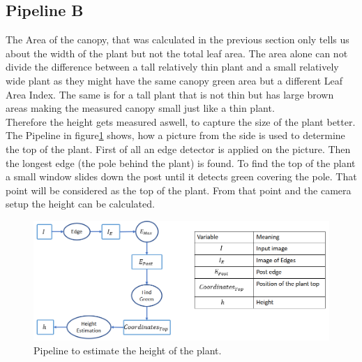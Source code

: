 \subsection{Pipeline B}

The Area of the canopy, that was calculated in the previous section only tells us about the width of the plant but not the total leaf area. The area alone can not divide the difference between a tall relatively thin plant and a small relatively wide plant as they might have the same canopy green area but a different Leaf Area Index. The same is for a tall plant that is not thin but has large brown areas making the measured canopy small just like a thin plant.\\
Therefore the height gets measured aswell, to capture the size of the plant better. The Pipeline in figure\ref{fig:pipelineB} shows, how a picture from the side is used to determine the top of the plant. First of all an edge detector is applied on the picture. Then the longest edge (the pole behind the plant) is found. To find the top of the plant a small window slides down the post until it detects green covering the pole. That point will be considered as the top of the plant. From that point and the camera setup the height can be calculated. 
   \begin{figure}[H]
       \centering
       \includegraphics[scale=0.6]{pipelineB.PNG}
       \caption{Pipeline to estimate the height of the plant.}
       \label{fig:pipelineB}
   \end{figure}
